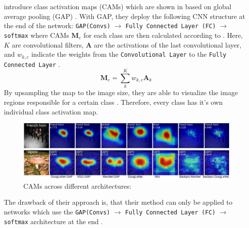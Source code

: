\citet{ZhouKLOT16} introduce class activation maps (CAMs) which are shown in  based on global average pooling (GAP) \citep{LinCY13}. With GAP, they deploy the following CNN structure at the end of the network: \texttt{GAP(Convs)} $\rightarrow$ \texttt{Fully Connected Layer (FC)} $\rightarrow$ \texttt{softmax} where CAMs $\mathbf{M}_{c}$ for each class are then calculated according to . Here, $K$ are convolutional filters, $\mathbf{A}$ are the activations of the last convolutional layer, and $ w_{k, c}$ indicate the weights from the \texttt{Convolutional Layer} to the \texttt{Fully Connected Layer} \citep{ZhouKLOT16}.
\begin{equation}
\label{eq:cam}
    \mathbf{M}_{c}=\sum_{k}^{K} w_{k, c} \mathbf{A}_{k}
\end{equation}
By upsampling the map to the image size, they are able to visualize the image regions responsible for a certain class \citep{ZhouKLOT16}. Therefore, every class has it's own individual class activation map. 
\begin{figure}[htbp]
    \centering
    \includegraphics[width=\textwidth]{Figures/Chapter3/heatmapAll.pdf}
    \caption[CAMs across different architectures]{CAMs across different architectures: \citep{ZhouKLOT16}}
    \label{fig:cams}
\end{figure}
The drawback of their approach is, that their method can only be applied to networks which use the \texttt{GAP(Convs)} $\rightarrow$ \texttt{Fully Connected Layer (FC)} $\rightarrow$ \texttt{softmax} architecture at the end \citep{xie2020explainable}. 

